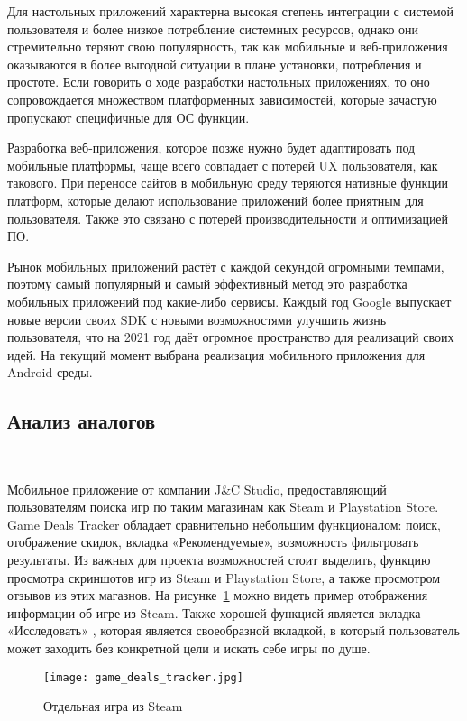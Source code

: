 Для настольных приложений характерна высокая степень интеграции с системой пользователя и более низкое потребление системных ресурсов, однако они стремительно теряют свою популярность, так как мобильные и веб-приложения оказываются в более выгодной ситуации в плане установки, потребления и простоте. Если говорить о ходе разработки настольных приложениях, то оно сопровождается множеством платформенных зависимостей, которые зачастую пропускают специфичные для ОС функции.

Разработка веб-приложения, которое позже нужно будет адаптировать под мобильные платформы, чаще всего совпадает с потерей UX пользователя, как такового. При переносе сайтов в мобильную среду теряются нативные функции платформ, которые делают использование приложений более приятным для пользователя. Также это связано с потерей производительности и оптимизацией ПО.

Рынок мобильных приложений растёт с каждой секундой огромными темпами, поэтому самый популярный и самый эффективный метод это разработка мобильных приложений под какие-либо сервисы. Каждый год Google выпускает новые версии своих SDK с новыми возможностями улучшить жизнь пользователя, что на 2021 год даёт огромное пространство для реализаций своих идей. На текущий момент выбрана реализация мобильного приложения для Android среды.

\subsection{Анализ аналогов}

~\par
Мобильное приложение от компании J\&C Studio, предоставляющий пользователям поиска игр по таким магазинам как Steam и Playstation Store. Game Deals Tracker обладает сравнительно небольшим функционалом: поиск, отображение скидок, вкладка «Рекомендуемые», возможность фильтровать результаты. Из важных для проекта возможностей стоит выделить, функцию просмотра скриншотов игр из Steam и Playstation Store, а также просмотром отзывов из этих магазнов. На рисунке~\ref{fig:domain:game_deals_tracker} можно видеть пример отображения информации об игре из Steam. Также хорошей функцией является вкладка «Исследовать» , которая является своеобразной вкладкой, в который пользователь может заходить без конкретной цели и искать себе игры по душе.
 
\begin{figure}[H]
 \centering
   \texttt{[image: game\_deals\_tracker.jpg]} 
   \caption{Отдельная игра из Steam}
   \label{fig:domain:game_deals_tracker}
\end{figure}
 

